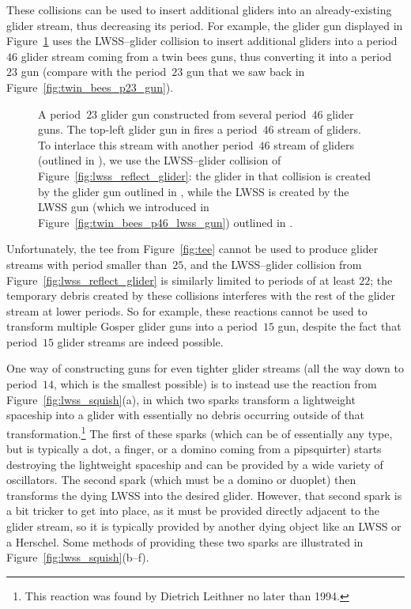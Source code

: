 These collisions can be used to insert additional gliders into an already-existing glider stream, thus decreasing its period. For example, the glider gun displayed in Figure~\ref{fig:p23_gun} uses the LWSS--glider collision to insert additional gliders into a period~$46$ glider stream coming from a twin bees guns, thus converting it into a period~$23$ gun (compare with the period~$23$ gun that we saw back in Figure~\ref{fig:twin_bees_p23_gun}).

\begin{figure}[!htb]
	\centering
	\caption{A period~$23$ glider gun constructed from several period~$46$ glider guns. The top-left glider gun in  fires a period~$46$ stream of gliders. To interlace this stream with another period~$46$ stream of gliders (outlined in ), we use the LWSS--glider collision of Figure~\ref{fig:lwss_reflect_glider}: the glider in that collision is created by the glider gun outlined in , while the LWSS is created by the LWSS gun (which we introduced in Figure~\ref{fig:twin_bees_p46_lwss_gun}) outlined in .}\label{fig:p23_gun}
\end{figure}

Unfortunately, the tee from Figure~\ref{fig:tee} cannot be used to produce glider streams with period smaller than~$25$, and the LWSS--glider collision from Figure~\ref{fig:lwss_reflect_glider} is similarly limited to periods of at least $22$; the temporary debris created by these collisions interferes with the rest of the glider stream at lower periods. So for example, these reactions cannot be used to transform multiple Gosper glider guns into a period~$15$ gun, despite the fact that period~$15$ glider streams are indeed possible.

One way of constructing guns for even tighter glider streams (all the way down to period~$14$, which is the smallest possible) is to instead use the reaction from Figure~\ref{fig:lwss_squish}(a), in which two sparks transform a lightweight spaceship into a glider with essentially no debris occurring outside of that transformation.\footnote{This reaction was found by Dietrich Leithner no later than 1994.} The first of these sparks (which can be of essentially any type, but is typically a dot, a finger, or a domino coming from a pipsquirter) starts destroying the lightweight spaceship and can be provided by a wide variety of oscillators. The second spark (which must be a domino or duoplet) then transforms the dying LWSS into the desired glider. However, that second spark is a bit tricker to get into place, as it must be provided directly adjacent to the glider stream, so it is typically provided by another dying object like an LWSS or a Herschel. Some methods of providing these two sparks are illustrated in Figure~\ref{fig:lwss_squish}(b--f).

